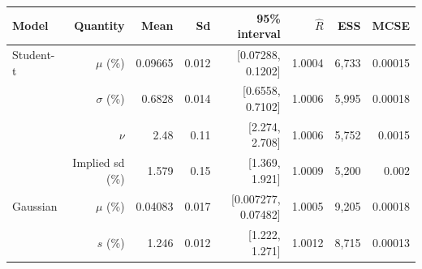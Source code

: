 \begin{tabular}{@{}lrrrrrrr@{}}
\toprule
Model & Quantity & Mean & Sd & 95\% interval & $\hat R$ & ESS & MCSE \\
\midrule
Student-t & $\mu$ (\%) & 0.09665 & 0.012 & [0.07288, 0.1202] & 1.0004 & 6,733 & 0.00015 \\
 & $\sigma$ (\%) & 0.6828 & 0.014 & [0.6558, 0.7102] & 1.0006 & 5,995 & 0.00018 \\
 & $\nu$ & 2.48 & 0.11 & [2.274, 2.708] & 1.0006 & 5,752 & 0.0015 \\
 & Implied sd (\%) & 1.579 & 0.15 & [1.369, 1.921] & 1.0009 & 5,200 & 0.002 \\
Gaussian & $\mu$ (\%) & 0.04083 & 0.017 & [0.007277, 0.07482] & 1.0005 & 9,205 & 0.00018 \\
 & $s$ (\%) & 1.246 & 0.012 & [1.222, 1.271] & 1.0012 & 8,715 & 0.00013 \\
\bottomrule
\end{tabular}
